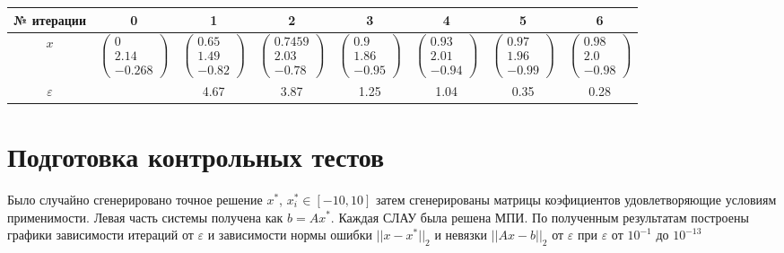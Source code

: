 \documentclass[11pt,a4paper]{article}
\let\epsilon\varepsilon
\renewcommand\;{\hspace{1cm}}
\begin{document}
\begin{center}
  \begin{tabular}{c | c | c | c | c | c | c | c}
    № итерации & 0 & 1 & 2 & 3 & 4 & 5 & 6\\
    \hline
    $x$ & $\begin{pmatrix}
      0 \\ 2.14 \\ -0.268
    \end{pmatrix}$ & $\begin{pmatrix}
      0.65 \\ 1.49 \\ -0.82
    \end{pmatrix}$ & $\begin{pmatrix}
      0.7459 \\ 2.03 \\ -0.78
    \end{pmatrix}$ & $\begin{pmatrix}
      0.9 \\ 1.86 \\ -0.95
    \end{pmatrix}$ & $\begin{pmatrix}
      0.93 \\ 2.01 \\ -0.94
    \end{pmatrix}$ & $\begin{pmatrix}
      0.97 \\ 1.96 \\ -0.99
    \end{pmatrix}$ & $\begin{pmatrix}
      0.98 \\ 2.0 \\ -0.98
    \end{pmatrix}$\\
    \hline
    $\epsilon$ & & 4.67 & 3.87 & 1.25 & 1.04 & 0.35 & 0.28
  \end{tabular}
\end{center}
\section{Подготовка контрольных тестов}
Было случайно сгенерировано точное решение $x^{*}$, $x^{*}_{i} \in [-10,10]$ затем сгенерированы матрицы коэфициентов удовлетворяющие условиям применимости. Левая часть системы получена как $b = Ax^{*}$. Каждая СЛАУ была решена МПИ.
По полученным результатам построены графики зависимости итераций от $\epsilon$ и зависимости нормы ошибки $||x-x^{*}||_{2}$ и невязки $||Ax - b||_{2}$ от $\epsilon$ при $\epsilon$ от $10^{-1}$ до $10^{-13}$
\end{document}

